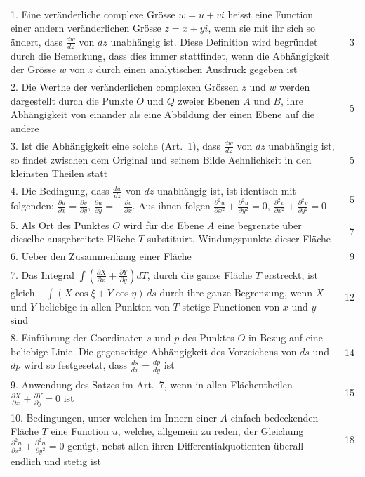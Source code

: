 \documentclass[12pt,a4paper]{article}
\begin{document}
\begin{center}
\begin{tabular}{p{}r}
1. Eine veränderliche complexe Grösse $w = u + vi$ heisst eine Function einer andern veränderlichen Grösse $z = x + yi$, wenn sie mit ihr sich so ändert, dass $\frac{dw}{dz}$ von $dz$ unabhängig ist. Diese Definition wird begründet durch die Bemerkung, dass dies immer stattfindet, wenn die Abhängigkeit der Grösse $w$ von $z$ durch einen analytischen Ausdruck gegeben ist \dotfill & 3\\[0.5em]
2. Die Werthe der veränderlichen complexen Grössen $z$ und $w$ werden dargestellt durch die Punkte $O$ und $Q$ zweier Ebenen $A$ und $B$, ihre Abhängigkeit von einander als eine Abbildung der einen Ebene auf die andere \dotfill & 5\\[0.5em]
3. Ist die Abhängigkeit eine solche (Art.~1), dass $\frac{dw}{dz}$ von $dz$ unabhängig ist, so findet zwischen dem Original und seinem Bilde Aehnlichkeit in den kleinsten Theilen statt \dotfill & 5\\[0.5em]
4. Die Bedingung, dass $\frac{dw}{dz}$ von $dz$ unabhängig ist, ist identisch mit folgenden: $\frac{\partial u}{\partial x} = \frac{\partial v}{\partial y}$, $\frac{\partial u}{\partial y} = -\frac{\partial v}{\partial x}$. Aus ihnen folgen $\frac{\partial^2 u}{\partial x^2} + \frac{\partial^2 u}{\partial y^2} = 0$, $\frac{\partial^2 v}{\partial x^2} + \frac{\partial^2 v}{\partial y^2} = 0$ \dotfill & 5\\[0.5em]
5. Als Ort des Punktes $O$ wird für die Ebene $A$ eine begrenzte über dieselbe ausgebreitete Fläche $T$ substituirt. Windungspunkte dieser Fläche \dotfill & 7\\[0.5em]
6. Ueber den Zusammenhang einer Fläche \dotfill & 9\\[0.5em]
7. Das Integral $\int \left(\frac{\partial X}{\partial x} + \frac{\partial Y}{\partial y}\right) dT$, durch die ganze Fläche $T$ erstreckt, ist gleich $-\int (X \cos\xi + Y \cos\eta)\, ds$ durch ihre ganze Begrenzung, wenn $X$ und $Y$ beliebige in allen Punkten von $T$ stetige Functionen von $x$ und $y$ sind \dotfill & 12\\[0.5em]
8. Einführung der Coordinaten $s$ und $p$ des Punktes $O$ in Bezug auf eine beliebige Linie. Die gegenseitige Abhängigkeit des Vorzeichens von $ds$ und $dp$ wird so festgesetzt, dass $\frac{ds}{dx} = \frac{dp}{dy}$ ist \dotfill & 14\\[0.5em]
9. Anwendung des Satzes im Art.~7, wenn in allen Flächentheilen $\frac{\partial X}{\partial x} + \frac{\partial Y}{\partial y} = 0$ ist \dotfill & 15\\[0.5em]
10. Bedingungen, unter welchen im Innern einer $A$ einfach bedeckenden Fläche $T$ eine Function $u$, welche, allgemein zu reden, der Gleichung $\frac{\partial^2 u}{\partial x^2} + \frac{\partial^2 u}{\partial y^2} = 0$ genügt, nebst allen ihren Differentialquotienten überall endlich und stetig ist \dotfill & 18\\[0.5em]
\end{tabular}
\end{center}
\end{document}
